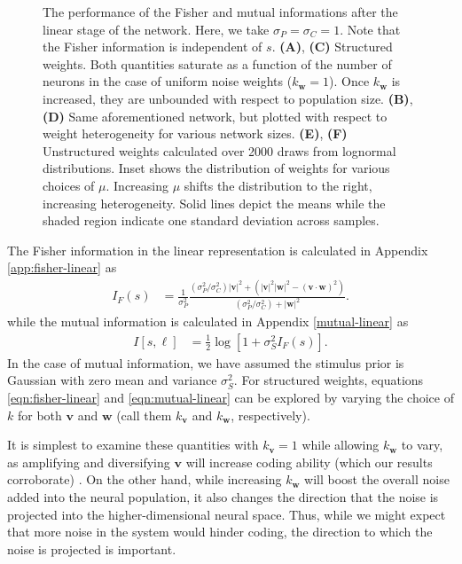 \documentclass[11pt]{article}
\begin{document}
\begin{figure}[t]
	\caption{The performance of the Fisher and mutual informations after the linear stage of the network. Here, we take $\sigma_P = \sigma_C=1$. Note that the Fisher information is independent of $s$. \textbf{(A)}, \textbf{(C)} Structured weights. Both quantities saturate as a function of the number of neurons in the case of uniform noise weights ($k_{\mathbf{w}}=1$). Once $k_{\mathbf{w}}$ is increased, they are unbounded with respect to population size. \textbf{(B)}, \textbf{(D)} Same aforementioned network, but plotted with respect to weight heterogeneity for various network sizes. \textbf{(E)}, \textbf{(F)} Unstructured weights calculated over 2000 draws from lognormal distributions. Inset shows the distribution of weights for various choices of $\mu$. Increasing $\mu$ shifts the distribution to the right, increasing heterogeneity. Solid lines depict the means while the shaded region indicate one standard deviation across samples.}\label{fig:struct-linear}
\end{figure}

The Fisher information in the linear representation is calculated in Appendix \ref{app:fisher-linear} as 
\begin{align}
	I_F(s) &= \frac{1}{\sigma_P^2}\frac{\left(\sigma_P^2/\sigma_C^2\right) |\mathbf{v}|^2 +  \left(|\mathbf{v}|^2|\mathbf{w}|^2 - (\mathbf{v}\cdot\mathbf{w})^2\right)}{(\sigma_P^2/\sigma_C^2)+ |\mathbf{w}|^2}. \label{eqn:fisher-linear}
\end{align}
while the mutual information is calculated in Appendix \ref{mutual-linear} as
\begin{align}
	I[s, \boldsymbol{\ell}] &= \frac{1}{2} \log \left[1 + \sigma_S^2 I_F(s)\right]. \label{eqn:mutual-linear}
\end{align}
In the case of mutual information, we have assumed the stimulus prior is Gaussian with zero mean and variance $\sigma_S^2$. For structured weights, equations \ref{eqn:fisher-linear} and \ref{eqn:mutual-linear} can be explored by varying the choice of $k$ for both $\mathbf{v}$ and $\mathbf{w}$ (call them $k_{\mathbf{v}}$ and $k_{\mathbf{w}}$, respectively).

It is simplest to examine these quantities with $k_{\mathbf{v}}=1$ while allowing $k_{\mathbf{w}}$ to vary, as amplifying and diversifying $\mathbf{v}$ will increase coding ability (which our results corroborate) \cite{Ecker2011}. On the other hand, while increasing $k_{\mathbf{w}}$ will boost the overall noise added into the neural population, it also changes the direction that the noise is projected into the higher-dimensional neural space. Thus, while we might expect that more noise in the system would hinder coding, the direction to which the noise is projected is important. 
\end{document}
